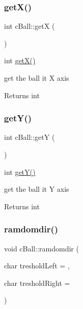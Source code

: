 \subsubsection{\texorpdfstring{get\+X()}{getX()}}
{\footnotesize\ttfamily int c\+Ball\+::getX (\begin{DoxyParamCaption}{ }\end{DoxyParamCaption})}



int \mbox{\hyperlink{classc_ball_a6216240ba8780e2510c2d2eb5c792be0}{get\+X()}} 

get the ball it X axis

\begin{DoxyReturn}{Returns}
int 
\end{DoxyReturn}
\mbox{\label{classc_ball_a4439db1ba25e8f69fde4fdf0fa1b4f24}} 
\subsubsection{\texorpdfstring{get\+Y()}{getY()}}
{\footnotesize\ttfamily int c\+Ball\+::getY (\begin{DoxyParamCaption}{ }\end{DoxyParamCaption})}



int \mbox{\hyperlink{classc_ball_a4439db1ba25e8f69fde4fdf0fa1b4f24}{get\+Y()}} 

get the ball it Y axis

\begin{DoxyReturn}{Returns}
int 
\end{DoxyReturn}
\mbox{\label{classc_ball_a65fd252361fa42fbe843a3cc73f2ebdb}} 
\subsubsection{\texorpdfstring{ramdomdir()}{ramdomdir()}}
{\footnotesize\ttfamily void c\+Ball\+::ramdomdir (\begin{DoxyParamCaption}\item[{char}]{treshold\+Left = {},  }\item[{char}]{treshold\+Right = {} }\end{DoxyParamCaption})}



